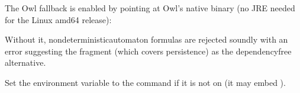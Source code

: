 \documentclass[a4paper,10pt,english]{sphinxmanual}
\begin{document}
\sphinxAtStartPar
The Owl fallback is enabled by pointing  at Owl’s native binary
(no JRE needed for the Linux amd64 release):

\begin{sphinxVerbatim}[commandchars=\\\{\}]
\end{sphinxVerbatim}

\sphinxAtStartPar
Without it, nondeterministic\sphinxhyphen{}automaton formulas are rejected soundly with an error
suggesting the  fragment (which covers persistence) as the dependency\sphinxhyphen{}free
alternative.

\sphinxAtStartPar
Set the environment variable  to the  command if it is not
on  (it may embed ).
\end{document}
